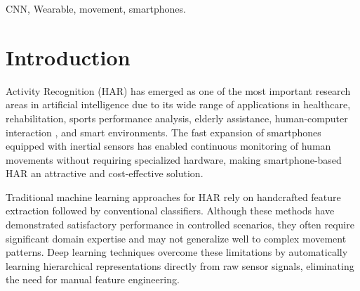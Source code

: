 \documentclass[journal]{IEEEtran}
\begin{document}
\begin{IEEEkeywords}
CNN, Wearable, movement, smartphones.
\end{IEEEkeywords}

%
\IEEEpeerreviewmaketitle



\section{Introduction}
% 
% 
% 
% 
 Activity Recognition (HAR) has emerged as one of the most important research areas in artificial intelligence due to its wide range of applications in healthcare, rehabilitation, sports performance analysis, elderly assistance, human-computer interaction \cite{bulling2014,lara2013}, and smart environments. The fast expansion of smartphones equipped with inertial sensors has enabled continuous monitoring of human movements without requiring specialized hardware, making smartphone-based HAR an attractive and cost-effective solution.

Traditional machine learning approaches for HAR rely on handcrafted feature extraction followed by conventional classifiers. Although these methods have demonstrated satisfactory performance in controlled scenarios, they often require significant domain expertise and may not generalize well to complex movement patterns. Deep learning techniques overcome these limitations by automatically learning hierarchical representations directly from raw sensor signals, eliminating the need for manual feature engineering.
\end{document}
